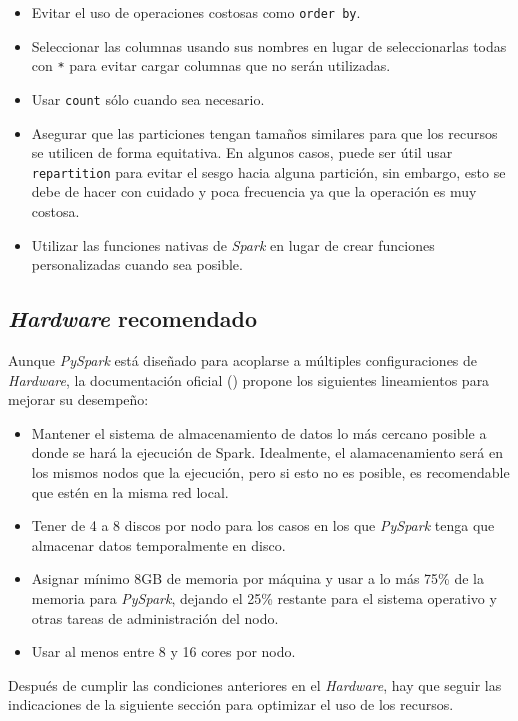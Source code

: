 \begin{itemize}
	\item Evitar el uso de operaciones costosas como \texttt{order by}. 
	\item Seleccionar las columnas usando sus nombres en lugar de seleccionarlas todas con \texttt{*} para evitar cargar columnas que no serán utilizadas.
	\item Usar \texttt{count} sólo cuando sea necesario.
	\item Asegurar que las particiones tengan tamaños similares para que los recursos se utilicen de forma equitativa. En algunos casos, puede ser útil usar \texttt{repartition} para evitar el sesgo hacia alguna partición, sin embargo, esto se debe de hacer con cuidado y poca frecuencia ya que la operación es muy costosa.
	\item Utilizar las funciones nativas de \textit{Spark} en lugar de crear funciones personalizadas cuando sea posible.
\end{itemize}

\subsection{\textit{Hardware} recomendado}

Aunque \textit{PySpark} está diseñado para acoplarse a múltiples configuraciones de \textit{Hardware}, la documentación oficial (\cite{sparkhardware}) propone los siguientes lineamientos para mejorar su desempeño:
\begin{itemize}
	\item Mantener el sistema de almacenamiento de datos lo más cercano posible a donde se hará la ejecución de Spark. Idealmente, el alamacenamiento será en los mismos nodos que la ejecución, pero si esto no es posible, es recomendable que estén en la misma red local.
	\item Tener de 4 a 8 discos por nodo para los casos en los que \textit{PySpark} tenga que almacenar datos temporalmente en disco.
	\item Asignar mínimo 8GB de memoria por máquina y usar a lo más 75\% de la memoria para \textit{PySpark}, dejando el 25\% restante para el sistema operativo y otras tareas de administración del nodo.
	\item Usar al menos entre 8 y 16 cores por nodo. 
\end{itemize}

Después de cumplir las condiciones anteriores en el \textit{Hardware}, hay que seguir las indicaciones de la siguiente sección para optimizar el uso de los recursos.



